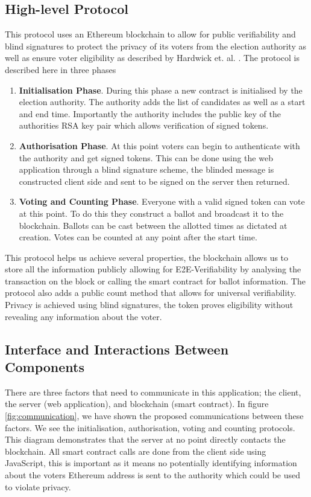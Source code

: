 \documentclass{entcs}
\begin{document}
\subsection{High-level Protocol} 
This protocol uses an Ethereum blockchain to allow for public verifiability and blind signatures to protect the privacy of its voters from the election authority as well as ensure voter eligibility as described by Hardwick et. al. \cite{hardwick2018}. The protocol is described here in three phases
\begin{enumerate}
    \item \textbf{Initialisation Phase}. During this phase a new contract is initialised by the election authority. The authority adds the list of candidates as well as a start and end time. Importantly the authority includes the public key of the authorities RSA key pair which allows verification of signed tokens.
    \item \textbf{Authorisation Phase}. At this point voters can begin to authenticate with the authority and get signed tokens. This can be done using the web application through a blind signature scheme, the blinded message is constructed client side and sent to be signed on the server then returned.
    \item \textbf{Voting and Counting Phase}. Everyone with a valid signed token can vote at this point. To do this they construct a ballot and broadcast it to the blockchain. Ballots can be cast between the allotted times as dictated at creation. Votes can be counted at any point after the start time.
\end{enumerate}

This protocol helps us achieve several properties, the blockchain allows us to store all the information publicly allowing for E2E-Verifiability by analysing the transaction on the block or calling the smart contract for ballot information. The protocol also adds a public count method that allows for universal verifiability. Privacy is achieved using blind signatures, the token proves eligibility without revealing any information about the voter.

\subsection{Interface and Interactions Between Components}
There are three factors that need to communicate in this application; the client, the server (web application), and blockchain (smart contract). In figure \ref{fig:communication}, we have shown the proposed communications between these factors. We see the initialisation, authorisation, voting and counting protocols. This diagram demonstrates that the server at no point directly contacts the blockchain. All smart contract calls are done from the client side using JavaScript, this is important as it means no potentially identifying information about the voters Ethereum address is sent to the authority which could be used to violate privacy.
\end{document}
